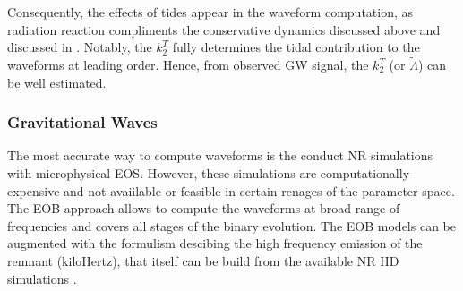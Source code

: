 Consequently, the effects of tides appear in the waveform computation, as radiation reaction 
compliments the conservative dynamics discussed above \cite{41} and discussed in \cite{6,42}.
%
%
Notably, the $k_2^T$ fully determines the tidal contribution to the waveforms at leading order. 
Hence, from observed \ac{GW} signal, the $k_2^T$ (or $\tilde{\Lambda}$) can be well estimated. 
%

\subsubsection{Gravitational Waves}

The most accurate way to compute waveforms is the conduct \ac{NR} simulations with microphysical 
\ac{EOS}. However, these simulations are computationally expensive and not avaiilable or feasible 
in certain renages of the parameter space.
The \ac{EOB} approach allows to compute the waveforms at broad range of frequencies and 
covers all stages of the binary evolution. 
The \ac{EOB} models can be augmented with the formulism descibing the 
high frequency emission of the remnant (kiloHertz), that itself can be build from the 
available \ac{NR} \ac{HD} simulations \cite{56,57,58}.

